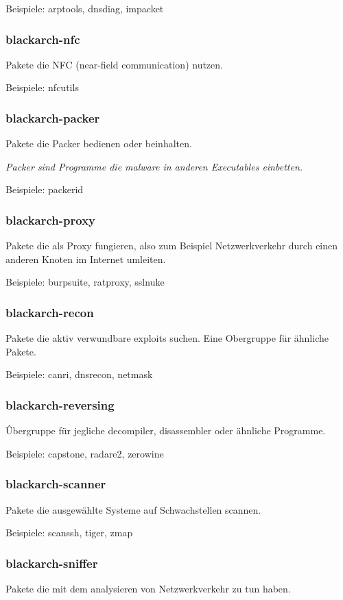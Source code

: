 \documentclass[a4paper, oneside, 11pt]{book}
\begin{document}
Beispiele: arptools, dnsdiag, impacket

\subsubsection{blackarch-nfc}
Pakete die NFC (near-field communication) nutzen.

Beispiele: nfcutils

\subsubsection{blackarch-packer}
Pakete die Packer bedienen oder beinhalten.

\textit{Packer sind Programme die malware in anderen Executables einbetten. }

Beispiele: packerid

\subsubsection{blackarch-proxy}
Pakete die als Proxy fungieren, also zum Beispiel Netzwerkverkehr durch einen
anderen Knoten im Internet umleiten.

Beispiele: burpsuite, ratproxy, sslnuke

\subsubsection{blackarch-recon}
Pakete die aktiv verwundbare exploits suchen.
Eine Obergruppe für ähnliche Pakete.

Beispiele: canri, dnsrecon, netmask

\subsubsection{blackarch-reversing}
Ûbergruppe für jegliche decompiler, 
disassembler oder ähnliche Programme.

Beispiele: capstone, radare2, zerowine

\subsubsection{blackarch-scanner}
Pakete die ausgewählte Systeme auf Schwachstellen scannen.

Beispiele: scanssh, tiger, zmap

\subsubsection{blackarch-sniffer}
Pakete die mit dem analysieren von Netzwerkverkehr
zu tun haben.
\end{document}
